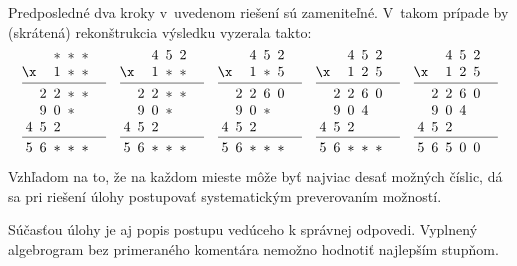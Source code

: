 {\poznamka
Predposledné dva kroky v~uvedenom riešení sú zameniteľné.
V~takom prípade by (skrátená) rekonštrukcia výsledku vyzerala takto:
$$
\vbox{\let\\=\cr
\halign{&\hbox to1.0em{\hss$#$\hss}\\
   &&*&*&* \\
\x &&1&*&* \\
\noalign{\vskip4pt\hrule\vskip4pt}
  &2&2&*&* \\
  &9&0&*&& \\
  4&5&2&&& \\
\noalign{\vskip4pt\hrule\vskip4pt}
 5&6&*&*&* \\
}} \quad
\vbox{\let\\=\cr
\halign{&\hbox to1.0em{\hss$#$\hss}\\
   &&4&5&2 \\
\x &&1&*&* \\
\noalign{\vskip4pt\hrule\vskip4pt}
  &2&2&*&* \\
  &9&0&*&& \\
  4&5&2&&& \\
\noalign{\vskip4pt\hrule\vskip4pt}
 5&6&*&*&* \\
}} \quad
\vbox{\let\\=\cr
\halign{&\hbox to1.0em{\hss$#$\hss}\\
   &&4&5&2 \\
\x &&1&*&5 \\
\noalign{\vskip4pt\hrule\vskip4pt}
  &2&2&6&0 \\
  &9&0&*&& \\
  4&5&2&&& \\
\noalign{\vskip4pt\hrule\vskip4pt}
 5&6&*&*&* \\
}} \quad
\vbox{\let\\=\cr
\halign{&\hbox to1.0em{\hss$#$\hss}\\
   &&4&5&2 \\
\x &&1&2&5 \\
\noalign{\vskip4pt\hrule\vskip4pt}
  &2&2&6&0 \\
  &9&0&4&& \\
  4&5&2&&& \\
\noalign{\vskip4pt\hrule\vskip4pt}
 5&6&*&*&* \\
}} \quad
\vbox{\let\\=\cr
\halign{&\hbox to1.0em{\hss$#$\hss}\\
   &&4&5&2 \\
\x &&1&2&5 \\
\noalign{\vskip4pt\hrule\vskip4pt}
  &2&2&6&0 \\
  &9&0&4&& \\
  4&5&2&&& \\
\noalign{\vskip4pt\hrule\vskip4pt}
 5&6&5&0&0 \\
}}
$$

Vzhľadom na to, že na každom mieste môže byť najviac desať možných číslic, dá sa pri riešení úlohy postupovať systematickým preverovaním možností.

Súčasťou úlohy je aj popis postupu vedúceho k správnej odpovedi.
Vyplnený algebrogram bez primeraného komentára nemožno hodnotiť najlepším stupňom.}

